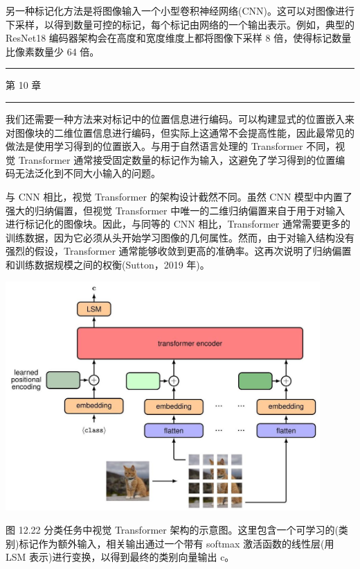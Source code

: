 \documentclass[10pt]{report}
\newcommand{\HRule}{\begin{center}\rule{0.9\linewidth}{0.2mm}\end{center}}
\begin{document}
另一种标记化方法是将图像输入一个小型卷积神经网络(CNN)。这可以对图像进行下采样，以得到数量可控的标记，每个标记由网络的一个输出表示。例如，典型的 ResNet18 编码器架构会在高度和宽度维度上都将图像下采样 8 倍，使得标记数量比像素数量少 64 倍。

\HRule

第 10 章

\HRule

我们还需要一种方法来对标记中的位置信息进行编码。可以构建显式的位置嵌入来对图像块的二维位置信息进行编码，但实际上这通常不会提高性能，因此最常见的做法是使用学习得到的位置嵌入。与用于自然语言处理的 Transformer 不同，视觉 Transformer 通常接受固定数量的标记作为输入，这避免了学习得到的位置编码无法泛化到不同大小输入的问题。

与 CNN 相比，视觉 Transformer 的架构设计截然不同。虽然 CNN 模型中内置了强大的归纳偏置，但视觉 Transformer 中唯一的二维归纳偏置来自于用于对输入进行标记化的图像块。因此，与同等的 CNN 相比，Transformer 通常需要更多的训练数据，因为它必须从头开始学习图像的几何属性。然而，由于对输入结构没有强烈的假设，Transformer 通常能够收敛到更高的准确率。这再次说明了归纳偏置和训练数据规模之间的权衡(Sutton，2019 年)。

\begin{center}
\includegraphics[max width=0.9\textwidth]{images/0194e279-9b28-703a-88f4-c3ac21e2010d_415_325_348_1193_868_0.jpg}
\end{center}
\hspace*{3em} 

图 12.22 分类任务中视觉 Transformer 架构的示意图。这里包含一个可学习的(类别)标记作为额外输入，相关输出通过一个带有 softmax 激活函数的线性层(用 LSM 表示)进行变换，以得到最终的类别向量输出 c。
\end{document}
